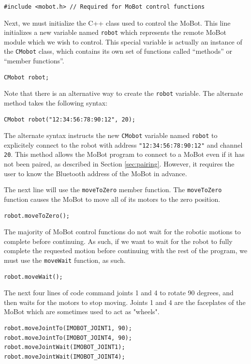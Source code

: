 \documentclass{article}
\begin{document}
\begin{verbatim}
#include <mobot.h> // Required for MoBot control functions
\end{verbatim}

Next, we must initialize the C++ class used to control the MoBot. This line
initializes a new variable named \texttt{robot} which represents the remote
MoBot module which we wish to control. This special variable is actually an
instance of the \texttt{CMobot} class, which contains its own set of
functions called ``methods'' or ``member functions''.
\begin{verbatim}
CMobot robot;
\end{verbatim}
Note that there is an alternative way to create the \texttt{robot} variable.
The alternate method takes the following syntax:
\begin{verbatim}
CMobot robot("12:34:56:78:90:12", 20);
\end{verbatim}
The alternate syntax instructs the new \texttt{CMobot} variable named 
\texttt{robot} to explicitely connect to the robot with address
\texttt{"12:34:56:78:90:12"} and channel \texttt{20}. This method allows
the MoBot program to connect to a MoBot even if it has not been paired,
as described in Section \ref{sec:pairing}. However, it requires the user
to know the Bluetooth address of the MoBot in advance.

The next line will use the \texttt{moveToZero} member function. The
\texttt{moveToZero} function causes the MoBot to move all of its motors to the
zero position.
\begin{verbatim}
robot.moveToZero();
\end{verbatim}

The majority of MoBot control functions do not wait for the robotic motions to
complete before continuing. As such, if we want to wait for the robot to fully
complete the requested motion before continuing with the rest of the program,
we must use the \texttt{moveWait} function, as such.
\begin{verbatim}
robot.moveWait();
\end{verbatim}

The next four lines of code command joints 1 and 4 to rotate 90 degrees, and
then waits for the motors to stop moving. Joints 1 and 4 are the faceplates
of the MoBot which are sometimes used to act as "wheels".
\begin{verbatim}
robot.moveJointTo(IMOBOT_JOINT1, 90);
robot.moveJointTo(IMOBOT_JOINT4, 90);
robot.moveJointWait(IMOBOT_JOINT1);
robot.moveJointWait(IMOBOT_JOINT4);
\end{verbatim}
\end{document}
